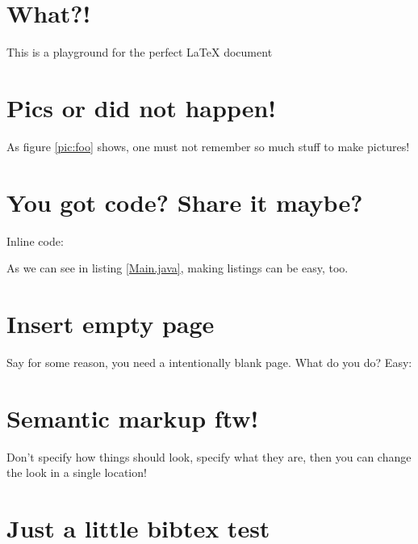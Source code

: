 




\chapter{What?!}

This is a playground for the perfect\texttrademark{} \LaTeX{} document

\chapter{Pics or did not happen!}

As figure \ref{pic:foo} shows, one must not remember so much stuff to make pictures!


\chapter{You got code? Share it maybe?}

Inline code: 

As we can see in listing \ref{Main.java}, making listings can be easy, too.


\chapter{Insert empty page}

Say for some reason, you need a intentionally blank page. What do you do? Easy:

\insertEmptyPage

\chapter{Semantic markup ftw!}

Don't specify how things should look, specify what they are, then you can change the look in a single location!



\chapter{Just a little bibtex test}

\blindtext~\cite{SomeRef}





